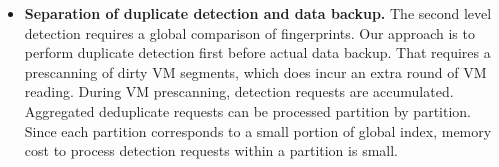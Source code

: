 \begin{itemize}


\item {\bf Separation of duplicate detection and data backup.}
The second level detection requires a global comparison of fingerprints.
Our approach is to perform duplicate detection first before actual data backup.
That requires a prescanning of  dirty VM segments, which
does incur an extra  round of VM reading.
During VM prescanning, detection requests are accumulated.
Aggregated deduplicate requests can be processed partition by partition. 
Since each partition corresponds to a small portion of global index, 
memory cost to process detection requests within a partition is small.


\end{itemize}
